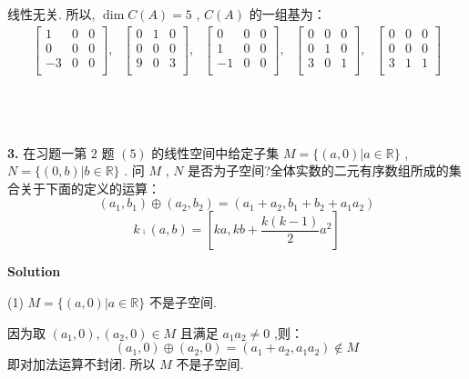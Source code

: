\documentclass[11pt,a4paper,openany,oneside]{book}
\newcommand\Solution{\noindent\textbf{\textsf{Solution}}\par\medskip}
\begin{document}
线性无关. 所以,  $ \dim C(A)= 5 $ ,  $ C(A) $ 的一组基为：
\begin{gather*}
\begin{bmatrix}
1 &  0  &  0  \\
0 &  0  &  0  \\
-3 &  0  &  0  \\
\end{bmatrix},
\ \ \ 
\begin{bmatrix}
0 &  1  &  0  \\
0 &  0  &  0  \\
9 &  0  &  3  \\
\end{bmatrix},
\ \ \ 
\begin{bmatrix}
0 &  0  &  0  \\
1 &  0  &  0  \\
-1&  0  &  0  \\
\end{bmatrix},
\ \ \ 
\begin{bmatrix}
0 &  0  &  0  \\
0 &  1  &  0  \\
3 &  0  &  1  \\
\end{bmatrix},
\ \ \ 
\begin{bmatrix}
0 &  0  &  0  \\
0 &  0  &  0  \\
3 &  1  &  1  \\
\end{bmatrix}
\end{gather*} \\  \\  \\  



\begin{myexample}
	\textbf{3.} 
在习题一第 $ 2 $ 题 $ (5) $ 的线性空间中给定子集 $ M = \{(a, 0) | a \in \mathbb{R} \} $ ,  $ N = \{(0, b)| b \in \mathbb{R} \} $ . 问 $ M $ ,  $ N $ 是否为子空间?全体实数的二元有序数组所成的集合关于下面的定义的运算：
 $$  (a_1, b_1) \oplus  (a_2, b_2) = (a_1 + a_2, b_1 + b_2 + a_1a_2)  $$ 
 $$  k \comp (a, b) = \left[ ka, kb+\dfrac{k(k-1)}{2}a^2\right]  $$ 

\end{myexample}
\Solution

(1)  $ M = \{(a, 0) | a \in \mathbb{R} \} $  不是子空间. 

因为取 $  (a_1, 0), (a_2, 0) \in M  $  且满足 $ a_1a_2 \neq 0 $ ,则：
 $$  (a_1, 0) \oplus  (a_2, 0) = (a_1 + a_2, a_1a_2) \notin  M  $$ 
即对加法运算不封闭. 所以 $ M $ 不是子空间. \\
\end{document}
